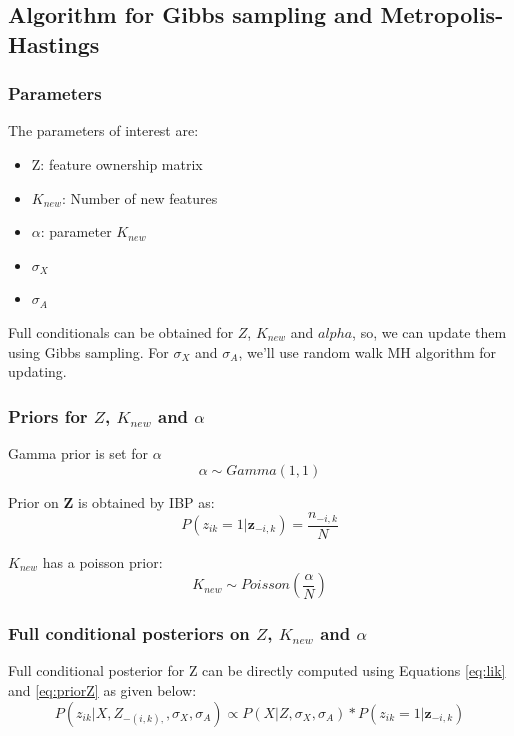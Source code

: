 \documentclass{article}
\begin{document}
\subsection{Algorithm for Gibbs sampling and Metropolis-Hastings}

\subsubsection{Parameters}
The parameters of interest are:
\begin{itemize}
\item{Z: feature ownership matrix}
\item{$K_{new}$: Number of new features}
\item{$\alpha$: parameter $K_{new}$}
\item{$\sigma_X$}
\item{$\sigma_A$}
\end{itemize}

Full conditionals can be obtained for $Z$, $K_{new}$ and $alpha$, so, we can update them using Gibbs sampling. For $\sigma_X$ and $\sigma_A$, we'll use random walk MH algorithm for updating.\\
\subsubsection{Priors for $Z$, $K_{new}$ and $\alpha$}

Gamma prior is set for $\alpha$
\begin{equation}\label{eq:prioralpha}
\alpha \sim Gamma(1,1)
\end{equation}

Prior on \textbf{Z} is obtained by IBP as:
\begin{equation}\label{eq:priorZ}
P(z_{ik}=1|\textbf{z}_{-i,k}) = \frac{n_{-i,k}}{N}
\end{equation}

$K_{new}$ has a poisson prior:
\begin{equation}\label{eq:priork}
K_{new} \sim Poisson(\frac{\alpha}{N})
\end{equation}



\subsubsection{Full conditional posteriors on $Z$, $K_{new}$ and $\alpha$}
Full conditional posterior for Z can be directly computed using Equations \eqref{eq:lik} and \eqref{eq:priorZ} as given below:
\begin{equation}\label{eq:postZ}
P(z_{ik}|X,Z_{-(i,k),},\sigma_X,\sigma_A) \propto  P(X|Z,\sigma_X, \sigma_A) * P(z_{ik}=1|\textbf{z}_{-i,k}) 
\end{equation}
\end{document}
